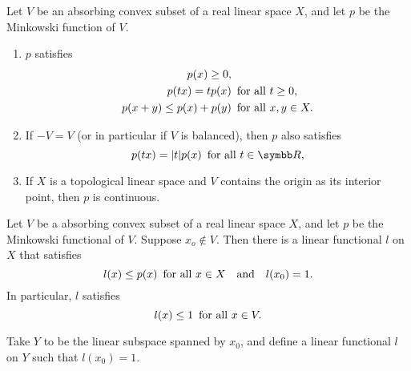 \begin{proposition}
  Let $V$ be an absorbing convex subset of a real linear space $X$, and let $p$ be the Minkowski function of $V$.
  \begin{enumerate}
    \item $p$ satisfies
    \begin{equation*}
      \begin{aligned}
        p(x)\geq 0,&\\
        p(tx)=tp(x) &\text{\enskip for all }t\geq 0,\\
        p(x+y)\leq p(x)+p(y) &\text{\enskip for all } x, y\in X.
      \end{aligned}
    \end{equation*}
    \item If $-V=V$ (or in particular if $V$ is balanced), then $p$ also satisfies
    \begin{equation*}
      p(tx)=\ABS tp(x)\text{\enskip for all }t\in\RR,
    \end{equation*}
    \item If $X$ is a topological linear space and $V$ contains the origin as its interior point, then $p$ is continuous.
  \end{enumerate}
\end{proposition}

\begin{theorem}
  Let $V$ be a absorbing convex subset of a real linear space $X$, and let $p$ be the Minkowski functional of $V$. Suppose $x_o\notin V$. Then there is a linear functional $l$ on $X$ that satisfies
  \begin{equation*}
    l(x)\leq p(x)\text{\enskip for all }x\in X\text{\quad and\quad}l(x_0)=1.
  \end{equation*}
  In particular, $l$ satisfies
  \begin{equation*}
    l(x)\leq 1\text{\enskip for all }x\in V.
  \end{equation*}
\end{theorem}

\begin{hint}
  Take $Y$ to be the linear subspace spanned by $x_0$, and define a linear functional $l$ on $Y$ such that $l(x_0)=1$.
\end{hint}

